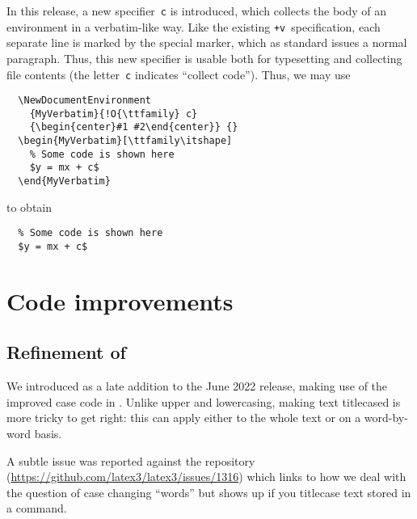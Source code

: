 \documentclass{ltnews}
\begin{document}
In this release, a new specifier~\texttt{c} is introduced, which
collects the body of an environment in a verbatim-like way. Like the
existing \texttt{+v}~specification, each separate line is marked by
the special  marker, which as standard issues a normal
paragraph. Thus, this new specifier is usable both for typesetting and
collecting file contents (the letter~\texttt{c} indicates
\enquote{collect code}). Thus, we may use
\begin{verbatim}
  \NewDocumentEnvironment
    {MyVerbatim}{!O{\ttfamily} c}
    {\begin{center}#1 #2\end{center}} {}
  \begin{MyVerbatim}[\ttfamily\itshape]
    % Some code is shown here
    $y = mx + c$
  \end{MyVerbatim}
\end{verbatim}
to obtain
\begin{center}
\makeatletter
\def\@verbatim{%
  \trivlist
  \centering
  \let \do \@makeother
  \dospecials
  \obeylines
  \normalfont \ttfamily \itshape
  \@noligs
}
\begin{verbatim}
  % Some code is shown here
  $y = mx + c$
\end{verbatim}
\end{center}

\section{Code improvements}

\subsection{Refinement of }

We introduced  as a late addition to the June 2022
release, making use of the improved case code in . Unlike
upper and lowercasing, making text titlecased is more tricky to get
right: this can apply either to the whole text or on a word-by-word
basis.

A subtle issue was reported against the  repository
(\url{https://github.com/latex3/latex3/issues/1316}) which links to
how we deal with the question of case changing \enquote{words} but
shows up if you titlecase text stored in a command.
\end{document}
